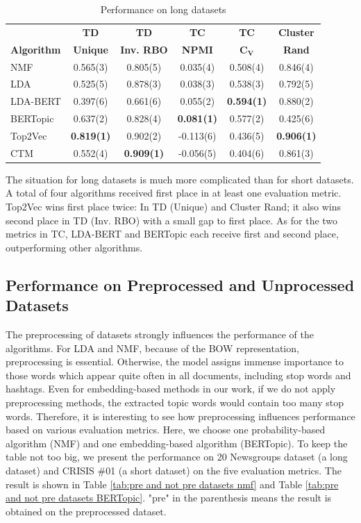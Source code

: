 \documentclass[11pt]{article}
\begin{document}
\begin{table}[ht]
\centering
\begin{adjustbox}{width=0.5\textwidth}
\begin{tabular}{lccccc}
\hline
\textbf{} & \textbf{TD} & \textbf{TD} & \textbf{TC} & \textbf{TC} & \textbf{Cluster}\\
\textbf{Algorithm} & \textbf{Unique} & \textbf{Inv. RBO} & \textbf{NPMI} & \textbf{C${_\mathbf{V}}$} & \textbf{Rand}\\
\hline
NMF & 0.565(3) & 0.805(5) & 0.035(4) & 0.508(4) & 0.846(4)\\ 
LDA & 0.525(5) & 0.878(3) & 0.038(3) & 0.538(3) & 0.792(5)\\
LDA-BERT & 0.397(6) & 0.661(6) & 0.055(2) & \textbf{0.594(1)} & 0.880(2)\\
BERTopic & 0.637(2) & 0.828(4) & \textbf{0.081(1)} & 0.577(2) & 0.425(6)\\
Top2Vec & \textbf{0.819(1)} & 0.902(2) & -0.113(6) & 0.436(5) & \textbf{0.906(1)}\\
CTM & 0.552(4) & \textbf{0.909(1)} & -0.056(5) & 0.404(6) & 0.861(3)\\
\hline
\end{tabular}
\end{adjustbox}
\caption{Performance on long datasets}
\label{tab:long datasets}
\end{table}

The situation for long datasets is much more complicated than for short datasets. A total of four algorithms received first place in at least one evaluation metric. Top2Vec wins first place twice: In TD (Unique) and Cluster Rand; it also wins second place in TD (Inv. RBO) with a small gap to first place. As for the two metrics in TC, LDA-BERT and BERTopic each receive first and second place, outperforming other algorithms.

\subsection{Performance on Preprocessed and Unprocessed Datasets}
The preprocessing of datasets strongly influences the performance of the algorithms. For LDA and NMF, because of the BOW representation, preprocessing is essential. Otherwise, the model assigns immense importance to those words which appear quite often in all documents, including stop words and hashtags. Even for embedding-based methods in our work, if we do not apply preprocessing methods, the extracted topic words would contain too many stop words. Therefore, it is interesting to see how preprocessing influences performance based on various evaluation metrics. Here, we choose one probability-based algorithm (NMF) and one embedding-based algorithm (BERTopic). To keep the table not too big, we present the performance on 20 Newsgroups dataset (a long dataset) and CRISIS \#01 (a short dataset) on the five evaluation metrics. The result is shown in Table \ref{tab:pre and not pre datasets nmf} and Table \ref{tab:pre and not pre datasets BERTopic}. "pre" in the parenthesis means the result is obtained on the preprocessed dataset.
\end{document}
